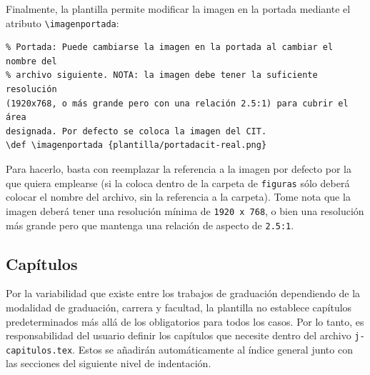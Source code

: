 Finalmente, la plantilla permite modificar la imagen en la portada mediante el atributo \verb|\imagenportada|:
\begin{verbatim}
% Portada: Puede cambiarse la imagen en la portada al cambiar el nombre del 
% archivo siguiente. NOTA: la imagen debe tener la suficiente resolución 
(1920x768, o más grande pero con una relación 2.5:1) para cubrir el área 
designada. Por defecto se coloca la imagen del CIT.
\def \imagenportada {plantilla/portadacit-real.png}
\end{verbatim}
Para hacerlo, basta con reemplazar la referencia a la imagen por defecto por la que quiera emplearse (si la coloca dentro de la carpeta de \verb|figuras| sólo deberá colocar el nombre del archivo, sin la referencia a la carpeta). Tome nota que la imagen deberá tener una resolución mínima de \texttt{1920 x 768}, o bien una resolución más grande pero que mantenga una relación de aspecto de \texttt{2.5:1}.

\subsection{Capítulos}

Por la variabilidad que existe entre los trabajos de graduación dependiendo de la modalidad de graduación, carrera y facultad, la plantilla no establece capítulos predeterminados más allá de los obligatorios para todos los casos. Por lo tanto, es responsabilidad del usuario definir los capítulos que necesite dentro del archivo \verb|j-capitulos.tex|. Estos se añadirán automáticamente al índice general junto con las secciones del siguiente nivel de indentación. 

